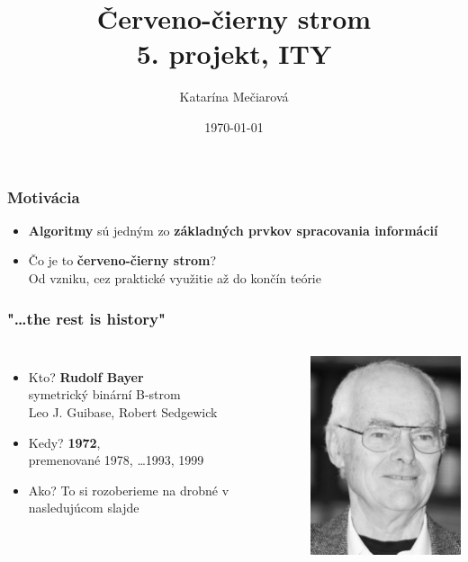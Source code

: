 \documentclass{beamer}
\date{\today}
\title{Červeno-čierny strom \\ 5. projekt, ITY}
\author{Katarína Mečiarová}
\begin{document}
    \frame[plain]{\titlepage}

    \begin{frame}
        \frametitle{Motivácia}
        \begin{itemize}
            \item \textbf{Algoritmy} sú jedným zo \textbf{základných prvkov spracovania informácií}
            \vfill
            \item Čo je to \textbf{červeno-čierny strom}?
            \vspace{10pt}
            \\ \footnotesize{Od vzniku, cez praktické využitie až do končín teórie}
        \end{itemize}
    \end{frame}

    \begin{frame}
        \frametitle{"\ldots the rest is history"}
        \begin{columns}
            \begin{itemize}
                \item Kto? \textbf{Rudolf Bayer}
                \vspace{5pt} \\ \footnotesize{symetrický binární B-strom} \vspace{10pt} \\
                Leo J. Guibase, Robert Sedgewick
                \vspace{10pt} \\
                \item \normalsize{Kedy}? \textbf{1972}, \\ \vspace{5pt}
                {\footnotesize{premenované 1978, \ldots 1993, 1999}}  \vspace{15pt}
                \item Ako? \footnotesize{To si rozoberieme na drobné v nasledujúcom slajde}
            \end{itemize}
            \includegraphics[width=150pt]{bayer}
        \end{columns}
    \end{frame}
\end{document}
